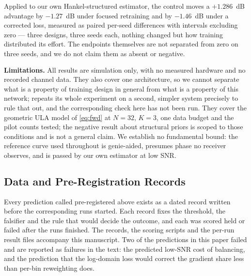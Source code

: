 \documentclass[journal]{IEEEtran}
\begin{document}
Applied to our own Hankel-structured estimator, the control moves a $+1.286$~dB
advantage by $-1.27$~dB under focused retraining and by $-1.46$~dB under a
corrected loss, measured as paired per-seed differences with intervals
excluding zero --- three designs, three seeds each, nothing changed but how
training distributed its effort. The endpoints themselves are not separated
from zero on three seeds, and we do not claim them as absent or negative.

\textbf{Limitations.} All results are simulation only, with no measured
hardware and no recorded channel data. They also cover one architecture, so we
cannot separate what is a property of training design in general from what is a
property of this network; \cite{wiesmayr2023bler} repeats its whole experiment
on a second, simpler system precisely to rule that out, and the corresponding
check here has not been run. They cover the geometric ULA model of
\eqref{eq:fwd} at $N=32$, $K=3$, one data budget and the pilot counts tested;
the negative result about structural priors is scoped to those conditions and
is not a general claim. We establish no fundamental bound: the reference curve
used throughout is genie-aided, presumes phase no receiver observes, and is
passed by our own estimator at low SNR.

\subsection*{Data and Pre-Registration Records}

Every prediction called pre-registered above exists as a dated record written
before the corresponding runs started. Each record fixes the threshold, the
falsifier and the rule that would decide the outcome, and each was scored held
or failed after the runs finished. The records, the scoring scripts and the
per-run result files accompany this manuscript. Two of the predictions in this
paper failed and are reported as failures in the text: the predicted low-SNR
cost of balancing, and the prediction that the log-domain loss would correct
the gradient share less than per-bin reweighting does.



\end{document}
